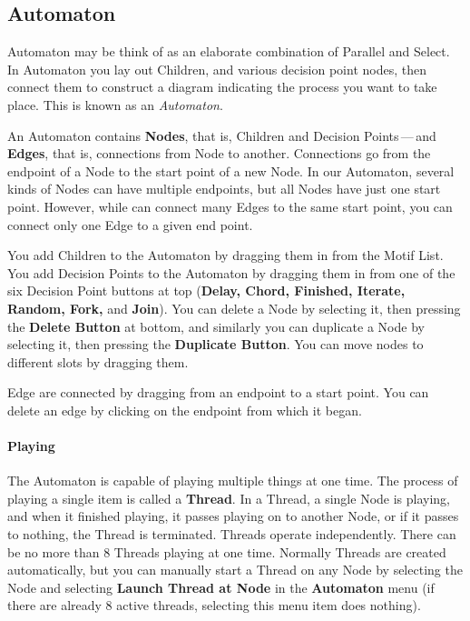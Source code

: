 \documentclass[twoside,10pt]{article}
\begin{document}
\subsection{Automaton}

Automaton may be think of as an elaborate combination of Parallel and Select.  In Automaton you lay out Children, and various decision point nodes, then connect them to construct a diagram indicating the process you want to take place.  This is known as an {\it Automaton}.  

An Automaton contains {\bf Nodes}, that is, Children and Decision Points\,---\,and {\bf Edges}, that is, connections from Node to another.  Connections go from the endpoint of a Node to the start point of a new Node.  In our Automaton, several kinds of Nodes can have multiple endpoints, but all Nodes have just one start point.  However, while can connect many Edges to the same start point, you can connect only one Edge to a given end point.

You add Children to the Automaton by dragging them in from the Motif List.  You add Decision Points to the Automaton by dragging them in from one of the six Decision Point buttons at top ({\bf Delay, Chord, Finished, Iterate, Random, Fork,} and {\bf Join}).  You can delete a Node by selecting it, then pressing the {\bf Delete Button} at bottom, and similarly you can duplicate a Node by selecting it, then pressing the {\bf Duplicate Button}.  You can move nodes to different slots by dragging them. 

Edge are connected by dragging from an endpoint to a start point.  You can delete an edge by clicking on the endpoint from which it began.

\paragraph{Playing}

The Automaton is capable of playing multiple things at one time.  The process of playing a single item is called a {\bf Thread}.   In a Thread, a single Node is playing, and when it finished playing, it passes playing on to another Node, or if it passes to nothing, the Thread is terminated.  Threads operate independently.  There can be no more than 8 Threads playing at one time.  Normally Threads are created automatically, but you can manually start a Thread on any Node by selecting the Node and selecting {\bf Launch Thread at Node} in the {\bf Automaton} menu (if there are already 8 active threads, selecting this menu item does nothing).
\end{document}
